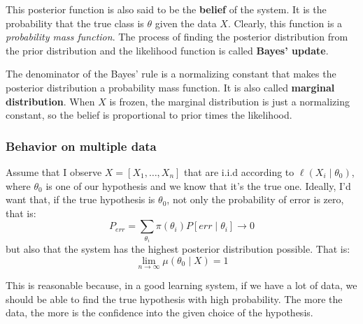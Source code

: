 This posterior function is also said to be the \textbf{belief} of the system. It is the probability that the true class is $\theta$ given the data $X$. Clearly, this function is a \textit{probability mass function}.
The process of finding the posterior distribution from the prior distribution and the likelihood function is called \textbf{Bayes' update}.

The denominator of the Bayes' rule is a normalizing constant that makes the posterior distribution a probability mass function. It is also called \textbf{marginal distribution}.
When $X$ is frozen, the marginal distribution is just a normalizing constant, so the belief is proportional to prior times the likelihood.

\subsubsection*{Behavior on multiple data}
Assume that I observe $X = \left[X_1, \dots, X_n\right]$ that are i.i.d according to $\ell(X_i \mid \theta_0)$, where $\theta_0$ is one of our hypothesis and we know that it's the true one.
Ideally, I'd want that, if the true hypothesis is $\theta_0$, not only the probability of error is zero, that is:
\[
    P_{err} = \sum_{\theta_i}\pi(\theta_i)P[err\mid \theta_i] \to 0
\]
but also that the system has the highest posterior distribution possible. That is:
\[
    \lim_{n \to \infty} \mu(\theta_0 \mid X) = 1
\]

This is reasonable because, in a good learning system, if we have a lot of data, we should be able to find the true hypothesis with high probability.
The more the data, the more is the confidence into the given choice of the hypothesis.

